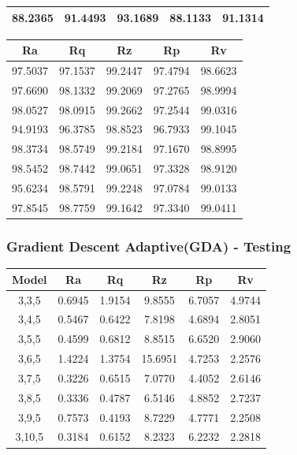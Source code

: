 \documentclass[suppldata]{interact}
\begin{document}
\begin {landscape}
\begin{minipage}{0.30\textwidth}
\begin{tabular}{|c|c|c|c|c|}
        88.2365 & 91.4493 & 93.1689 & 88.1133 & 91.1314 \\ \hline
    \end{tabular}
        \label{tab:gdamapetr}
    \end{minipage}
    \hfill 
        \begin{minipage}{0.40\textwidth}
        \small
    \begin{tabular}{|c|c|c|c|c|}
    \hline
        Ra &  Rq &  Rz &  Rp & Rv \\ \hline
        97.5037 & 97.1537 & 99.2447 & 97.4794 & 98.6623 \\ \hline
        97.6690 & 98.1332 & 99.2069 & 97.2765 & 98.9994 \\ \hline
        98.0527 & 98.0915 & 99.2662 & 97.2544 & 99.0316 \\ \hline
        94.9193 & 96.3785 & 98.8523 & 96.7933 & 99.1045 \\ \hline
        98.3734 & 98.5749 & 99.2184 & 97.1670 & 98.8995 \\ \hline
        98.5452 & 98.7442 & 99.0651 & 97.3328 & 98.9120 \\ \hline
        95.6234 & 98.5791 & 99.2248 & 97.0784 & 99.0133 \\ \hline
        97.8545 & 98.7759 & 99.1642 & 97.3340 & 99.0411 \\ \hline

    \end{tabular}
        \label{tab:gdar2tr}
    \end{minipage}
    \hfill 
    \subsubsection{ Gradient Descent Adaptive(GDA) - Testing}
   \begin{minipage}{0.35\textwidth}
   \small
    \begin{tabular}{|c|c|c|c|c|c|}
    \hline
        Model & Ra &  Rq &  Rz &  Rp & Rv \\ \hline
        3,3,5 & 0.6945 & 1.9154 & 9.8555 & 6.7057 & 4.9744 \\ \hline
        3,4,5 & 0.5467 & 0.6422 & 7.8198 & 4.6894 & 2.8051 \\ \hline
        3,5,5 & 0.4599 & 0.6812 & 8.8515 & 6.6520 & 2.9060 \\ \hline
        3,6,5 & 1.4224 & 1.3754 & 15.6951 & 4.7253 & 2.2576 \\ \hline
        3,7,5 & 0.3226 & 0.6515 & 7.0770 & 4.4052 & 2.6146 \\ \hline
        3,8,5 & 0.3336 & 0.4787 & 6.5146 & 4.8852 & 2.7237 \\ \hline
        3,9,5 & 0.7573 & 0.4193 & 8.7229 & 4.7771 & 2.2508 \\ \hline
        3,10,5 & 0.3184 & 0.6152 & 8.2323 & 6.2232 & 2.2818 \\ \hline


\end{tabular}
\end{minipage}
\end{landscape}
\end{document}
